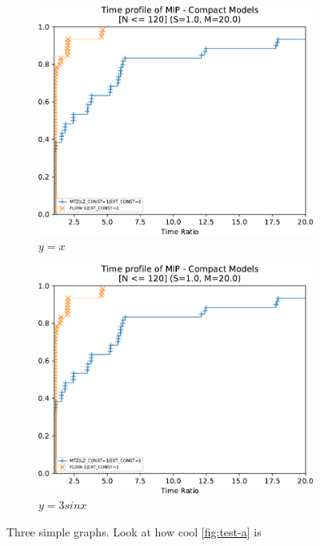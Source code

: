 \begin{figure}
	\

	\begin{subfigure}[b]{0.49\textwidth}
		\centering
		\includegraphics[width=\textwidth]{./Imgs/perfprof-tsp-example/time-ratio20.0.cropped.pdf}
		\caption{$y=x$}
		\label{fig:test-c}
	\end{subfigure}
	\hfill
	\begin{subfigure}[b]{0.49\textwidth}
		\centering
		\includegraphics[width=\textwidth]{./Imgs/perfprof-tsp-example/time-ratio20.0.cropped.pdf}
		\caption{$y=3sinx$}
		\label{fig:test-d}
	\end{subfigure}

	\caption{Three simple graphs. Look at how cool \cref{fig:test-a} is}
	\label{fig:three graphs}
\end{figure}

